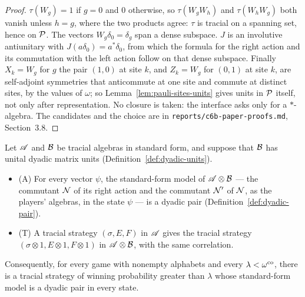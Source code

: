 \begin{proof}
\leanok
$\tau(W_g) = 1$ if $g = 0$ and $0$ otherwise, so $\tau(W_g W_h)$ and $\tau(W_h W_g)$ both vanish
unless $h = g$, where the two products agree: $\tau$ is tracial on a spanning set, hence on $\cal{P}$.
The vectors $W_g \delta_0 = \delta_g$ span a dense subspace. $J$ is an involutive antiunitary with
$J(a \delta_0) = a^* \delta_0$, from which the formula for the right action and its commutation with
the left action follow on that dense subspace. Finally $X_k = W_g$ for $g$ the pair $(1, 0)$ at site
$k$, and $Z_k = W_g$ for $(0, 1)$ at site $k$, are self-adjoint symmetries that anticommute at one
site and commute at distinct sites, by the values of $\omega$; so Lemma~\ref{lem:pauli-sites-units}
gives units in $\cal{P}$ itself, not only after representation. No closure is taken: the interface
asks only for a $*$-algebra. The candidates and the choice are in
\texttt{reports/c6b-paper-proofs.md}, Section~3.8.
\end{proof}

\begin{lemma}
\label{lem:amplification-dyadic}
\leanok
Let $\alg$ and $\cal{B}$ be tracial algebras in standard form, and suppose that $\cal{B}$ has unital
dyadic matrix units (Definition~\ref{def:dyadic-units}).
\begin{itemize}
\item (A) For every vector $\psi$, the standard-form model of $\alg \otimes \cal{B}$ --- the
  commutant $\cal{N}$ of its right action and the commutant $\cal{N}'$ of $\cal{N}$, as the players'
  algebras, in the state $\psi$ --- is a dyadic pair (Definition~\ref{def:dyadic-pair}).
\item (T) A tracial strategy $(\sigma, E, F)$ in $\alg$ gives the tracial strategy $(\sigma \otimes
  1, E \otimes 1, F \otimes 1)$ in $\alg \otimes \cal{B}$, with the same correlation.
\end{itemize}
Consequently, for every game with nonempty alphabets and every $\lambda < \omegaco$, there is a
tracial strategy of winning probability greater than $\lambda$ whose standard-form model is a
dyadic pair in every state.
\end{lemma}

